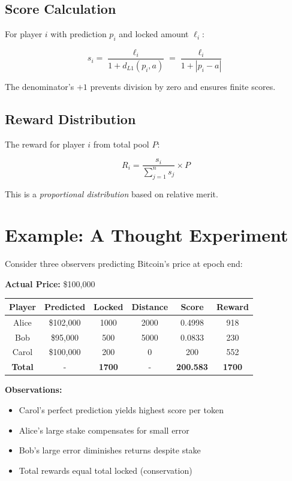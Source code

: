 \documentclass[12pt,a4paper]{article}
\begin{document}
\subsection{Score Calculation}
For player $i$ with prediction $p_i$ and locked amount $\ell_i$:

\begin{equation}
s_i = \frac{\ell_i}{1 + d_{L1}(p_i, a)} = \frac{\ell_i}{1 + |p_i - a|}
\end{equation}

The denominator's $+1$ prevents division by zero and ensures finite scores.

\subsection{Reward Distribution}
The reward for player $i$ from total pool $P$:

\begin{equation}
R_i = \frac{s_i}{\sum_{j=1}^{n} s_j} \times P
\end{equation}

This is a \textit{proportional distribution} based on relative merit.

\section{Example: A Thought Experiment}

Consider three observers predicting Bitcoin's price at epoch end:

\textbf{Actual Price:} \$100,000

\begin{center}
\begin{tabular}{|c|c|c|c|c|c|}
\hline
\textbf{Player} & \textbf{Predicted} & \textbf{Locked} & \textbf{Distance} & \textbf{Score} & \textbf{Reward} \\
\hline
Alice & \$102,000 & 1000 & 2000 & 0.4998 & 918 \\
Bob & \$95,000 & 500 & 5000 & 0.0833 & 230 \\
Carol & \$100,000 & 200 & 0 & 200 & 552 \\
\hline
\textbf{Total} & - & \textbf{1700} & - & \textbf{200.583} & \textbf{1700} \\
\hline
\end{tabular}
\end{center}

\textbf{Observations:}
\begin{itemize}
\item Carol's perfect prediction yields highest score per token
\item Alice's large stake compensates for small error
\item Bob's large error diminishes returns despite stake
\item Total rewards equal total locked (conservation)
\end{itemize}
\end{document}
